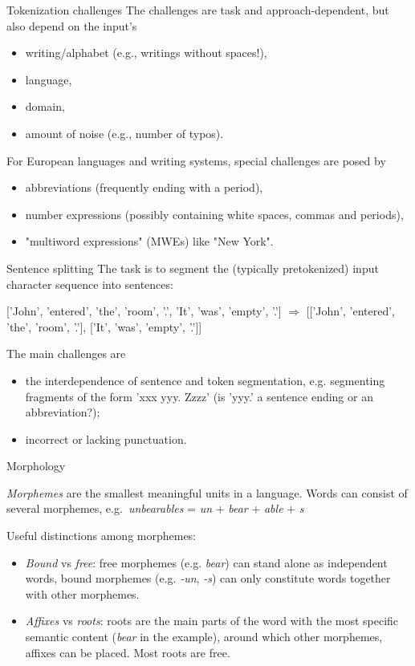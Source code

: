 \documentclass[style=upen, size=14pt]{powerdot}
\newcommand{\gold}{\color{arany}}
\begin{document}
\begin{slide}[toc=]{Tokenization challenges}
  The challenges are task and approach-dependent, but also depend on the input's
  \begin{itemize}
  \item writing/alphabet (e.g., writings without spaces!),
  \item language,
  \item domain,
  \item amount of noise (e.g., number of typos).
  \end{itemize}
  For European languages and writing systems, special challenges are posed by
  \begin{itemize}
  \item abbreviations (frequently ending with a period),
  \item number expressions (possibly containing white spaces, commas and periods),
  \item "multiword expressions" (MWEs) like "New York".
  \end{itemize}
\end{slide}

\begin{slide}{Sentence splitting}
  The task is to segment the (typically pretokenized) input character sequence
  into sentences:\bigskip

  ['John', 'entered', 'the', 'room', '.', 'It', 'was', 'empty', '.'] $\Rightarrow$
  [['John', 'entered', 'the', 'room', '.'], ['It', 'was', 'empty', '.']]\bigskip

  The main challenges are
  \begin{itemize}
  \item the interdependence of sentence and token segmentation, e.g. segmenting
    fragments of the form 'xxx yyy. Zzzz' (is 'yyy.' a sentence ending or an
    abbreviation?);
  \item incorrect or lacking punctuation.
  \end{itemize}
\end{slide}

\begin{slide}[toc=Morphology]{Morphology}
 
  \emph{\gold Morphemes} are the smallest meaningful units in a language. Words can
  consist of several morphemes, e.g.\
  \emph{unbearables} = \emph{un} + \emph{bear} + \emph{able} + \emph{s}\bigskip

  Useful distinctions among morphemes:

  \begin{itemize}
  \item \emph{\gold Bound} vs \emph{{\gold free}}: free morphemes (e.g. \emph{bear})
    can stand alone as independent words, bound morphemes (e.g. \emph{-un},
    \emph{-s}) can only constitute words together with other morphemes.
  \item \emph{\gold Affixes} vs \emph{\gold roots}: roots are the main parts of the word
    with the most specific semantic content (\emph{bear} in the example), around
    which other morphemes, affixes can be placed. Most roots are free.
  \end{itemize}
\end{slide}
\end{document}
